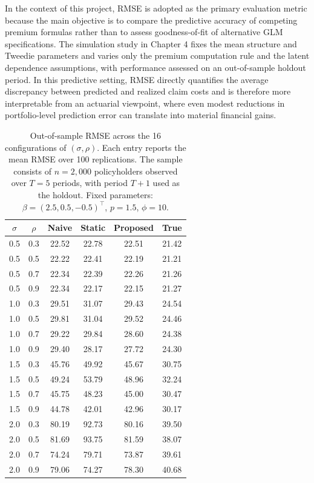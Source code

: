 \documentclass{sfuthesis}
\numberwithin{equation}{chapter}
\begin{document}
In the context of this project, RMSE is adopted as the primary evaluation metric because the main objective is to compare the predictive accuracy of competing premium formulas rather than to assess goodness-of-fit of alternative GLM specifications. The simulation study in Chapter 4 fixes the mean structure and Tweedie parameters and varies only the premium computation rule and the latent dependence assumptions, with performance assessed on an out-of-sample holdout period. In this predictive setting, RMSE directly quantifies the average discrepancy between predicted and realized claim costs and is therefore more interpretable from an actuarial viewpoint, where even modest reductions in portfolio-level prediction error can translate into material financial gains. 
\begin{table}[htbp]
\centering
\caption{Out-of-sample RMSE across the 16 configurations of $(\sigma,\rho)$. Each entry reports the mean RMSE over 100 replications. The sample consists of $n = 2{,}000$ policyholders observed over $T = 5$ periods, with period $T+1$ used as the holdout. Fixed parameters: $\beta = (2.5, 0.5, -0.5)^\top$, $p = 1.5$, $\phi = 10$.}
\label{tab:rmse-grid}
\begin{tabular}{cccccc}
\hline
$\sigma$ & $\rho$ & Naive & Static & Proposed & True \\
\hline
0.5 & 0.3 & 22.52  & 22.78  & 22.51  & 21.42  \\
0.5 & 0.5 & 22.22  & 22.41 & 22.19  & 21.21  \\
0.5 & 0.7 & 22.34  & 22.39  & 22.26 & 21.26  \\
0.5 & 0.9 & 22.34  & 22.17 & 22.15  & 21.27 \\
1.0 & 0.3 & 29.51  & 31.07  & 29.43  & 24.54  \\
1.0 & 0.5 & 29.81  & 31.04  & 29.52 & 24.46  \\
1.0 & 0.7 & 29.22  & 29.84  & 28.60  & 24.38  \\
1.0 & 0.9 & 29.40 & 28.17 & 27.72 & 24.30 \\
1.5 & 0.3 & 45.76 & 49.92 & 45.67  & 30.75  \\
1.5 & 0.5 & 49.24 & 53.79  & 48.96 & 32.24  \\
1.5 & 0.7 & 45.75 & 48.23  & 45.00  & 30.47  \\
1.5 & 0.9 & 44.78 & 42.01   & 42.96  & 30.17  \\
2.0 & 0.3 & 80.19  & 92.73  & 80.16  & 39.50  \\
2.0 & 0.5 & 81.69 & 93.75  & 81.59  & 38.07  \\
2.0 & 0.7 & 74.24  & 79.71  & 73.87  & 39.61  \\
2.0 & 0.9 & 79.06  & 74.27  & 78.30  & 40.68  \\
\hline
\end{tabular}
\end{table}
\end{document}
